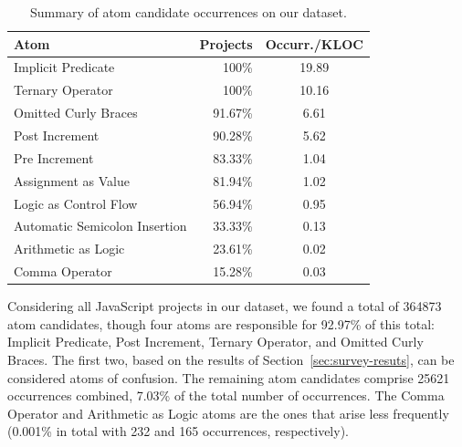 \begin{table}[ht]
\centering
\caption{Summary of atom candidate occurrences on our dataset.}
\setlength\tabcolsep{2pt} %
\begin{tabular}{lrc}%
  \toprule
Atom & Projects & Occurr./KLOC \\%
  \midrule
Implicit Predicate & 100\% & 19.89 \\%
  Ternary Operator & 100\% & 10.16 \\%
  Omitted Curly Braces & 91.67\% & 6.61 \\%
  Post Increment & 90.28\% & 5.62 \\%
  Pre Increment & 83.33\% & 1.04 \\%
  Assignment as Value & 81.94\% & 1.02 \\%
  Logic as Control Flow & 56.94\% & 0.95 \\%
  Automatic Semicolon Insertion & 33.33\% & 0.13 \\%
  Arithmetic as Logic & 23.61\% & 0.02 \\%
  Comma Operator & 15.28\% & 0.03 \\%
   \bottomrule
\end{tabular}
\label{tab:occurrences-summary}
\end{table}


Considering all JavaScript projects in our dataset, we found a total of \num{364873} atom candidates, though four atoms are responsible
for 92.97\% of this total: Implicit Predicate, Post Increment, Ternary Operator, and Omitted Curly Braces. The first two, based on the results of Section~\ref{sec:survey-resuts}, can be considered atoms of confusion. The remaining atom
candidates comprise \num{25621} occurrences combined, 7.03\% of the total number of occurrences.
The Comma Operator and Arithmetic as Logic atoms are the ones that arise less
frequently (0.001\% in total with 232 and 165 occurrences, respectively). 

